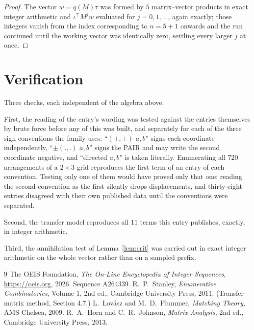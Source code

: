 \documentclass[11pt,a4paper]{article}
\theoremstyle{plain}
\theoremstyle{definition}
\begin{document}
\begin{proof}
The vector $w=q(M)\tau$ was formed by $5$ matrix--vector products in exact integer
arithmetic and $\iota^{\!\top}M^{j}w$ evaluated for $j=0,1,\dots$, again exactly; those
integers vanish from the index corresponding to $n=5+1$ onwards and the run continued
until the working vector was identically zero, settling every larger $j$ at once.
\end{proof}

\section{Verification}

Three checks, each independent of the algebra above.

First, the reading of the entry's wording was tested against the entries themselves by brute
force before any of this was built, and separately for each of the three sign conventions the
family uses: ``$(\pm,\pm)$ $a,b$'' signs each coordinate independently, ``$\pm(.,.)$ $a,b$''
signs the PAIR and may write the second coordinate negative, and ``directed $a,b$'' is taken
literally. Enumerating all $720$ arrangements of a $2\times3$ grid reproduces the first term
of an entry of each convention. Testing only one of them would have proved only that one:
reading the second convention as the first silently drops displacements, and thirty-eight
entries disagreed with their own published data until the conventions were separated.

Second, the transfer model reproduces all $11$ terms this entry publishes, exactly, in
integer arithmetic.

Third, the annihilation test of Lemma~\ref{lem:crit} was carried out in exact integer
arithmetic on the whole vector rather than on a sampled prefix.

\begin{thebibliography}{9}
 The OEIS Foundation, \emph{The On-Line Encyclopedia of Integer
Sequences}, \url{https://oeis.org}, 2026. Sequence A264339.
 R.~P.~Stanley, \emph{Enumerative Combinatorics}, Volume 1, 2nd ed.,
Cambridge University Press, 2011. (Transfer-matrix method, Section 4.7.)
 L.~Lov\'asz and M.~D.~Plummer, \emph{Matching Theory}, AMS Chelsea, 2009.
 R.~A.~Horn and C.~R.~Johnson, \emph{Matrix Analysis}, 2nd ed., Cambridge
University Press, 2013.
\end{thebibliography}
\end{document}
